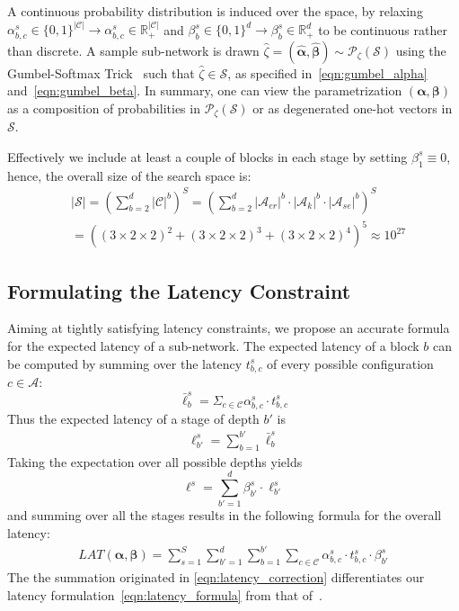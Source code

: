 \documentclass[dvipsnames,table,xcdraw]{article}
\newcommand{\balpha}{\bm{\alpha}}
\newcommand{\bbeta}{\bm{\beta}}
\begin{document}
A continuous probability distribution is induced over the space, by relaxing $\alpha^s_{b,c}\in \{0, 1\}^{\left|\mathcal{C}\right|} \rightarrow\alpha^s_{b,c}\in \mathbb{R}_+^{\left|\mathcal{C}\right|}$ and $ \beta^s_b\in \{0, 1\}^d \rightarrow\beta^s_b\in \mathbb{R}_+^d$ to be continuous rather than discrete.
A sample sub-network is drawn $\hat{\zeta}=(\hat{\balpha}, \hat{\bbeta})\sim \mathcal{P}_\zeta(\mathcal{S})$ using the Gumbel-Softmax Trick~\cite{GumbelSM} such that $\hat{\zeta}\in\mathcal{S}$, as specified in~\eqref{eqn:gumbel_alpha} and~\eqref{eqn:gumbel_beta}.
In summary, one can view the parametrization $(\balpha, \bbeta)$ as a composition of probabilities in $\mathcal{P}_{\zeta}(\mathcal{S})$ or as degenerated one-hot vectors in $\mathcal{S}$.

Effectively we include at least a couple of blocks in each stage by setting $\beta^s_1\equiv 0$, hence, the overall size of the search space is:
\begin{align*}
&|\mathcal{S}|=(\sum_{b=2}^d \left|\mathcal{C}\right|^b)^S =
(\sum_{b=2}^d \left|\mathcal{A}_{er}\right|^b\cdot\left|\mathcal{A}_{k}\right|^b\cdot\left|\mathcal{A}_{se}\right|^b)^S \\
&=((3\times 2\times 2)^2+(3\times 2 \times 2)^3+(3\times 2\times 2)^4)^5\approx 10^{27}
\end{align*}


\subsection{Formulating the Latency Constraint}
\label{sec:latency_formula}
Aiming at tightly satisfying latency constraints, we propose an accurate formula for the expected latency of a sub-network. The expected latency of a block $b$ can be computed by summing over the latency $t^s_{b,c}$ of every possible configuration $c\in\mathcal{A}$:
$$\bar{\ell}^s_{b}=\Sigma_{c\in\mathcal{C}} \alpha^s_{b,c} \cdot t^s_{b,c}$$
Thus the expected latency of a stage of depth $b'$ is 
\begin{align}\label{eqn:latency_correction}
\ell^s_{b'}=\sum_{b=1}^{b'}\bar{\ell}^s_{b}
\end{align}
Taking the expectation over all possible depths yields  
$$\ell^s= \sum_{b'=1}^d \beta^s_{b'}\cdot \ell^s_{b'}$$
and summing over all the stages results in the following formula for the overall latency:
\begin{align}\label{eqn:latency_formula}
   LAT(\balpha, \bbeta) = 
   \sum_{s=1}^S \sum_{b'=1}^d \sum_{b=1}^{b'}\sum_{c\in\mathcal{C}} \alpha^s_{b,c} \cdot t^s_{b,c} \cdot \beta^s_{b'}
\end{align}
The the summation originated in \eqref{eqn:latency_correction} differentiates our latency formulation~\eqref{eqn:latency_formula} from that of~\cite{TF-NAS}. 
\end{document}
